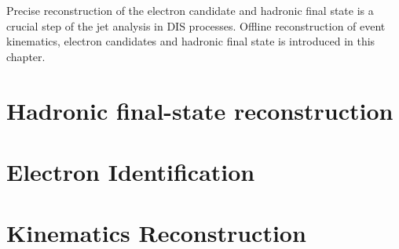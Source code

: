 Precise reconstruction of the electron candidate and hadronic final state is a crucial step of the jet analysis in DIS processes. 
Offline reconstruction of event kinematics, electron candidates and hadronic final state is introduced in this chapter.

\section{Hadronic final-state reconstruction}
\label{sec:hadronreco}


\section{Electron Identification}
\label{sec:eleid}


\section{Kinematics Reconstruction}
\label{sec:kinrec}



